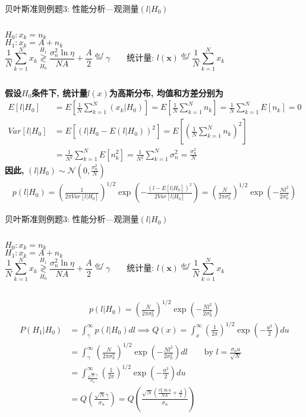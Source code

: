 \begin{frame}[shrink]{贝叶斯准则例题3: 性能分析---观测量$(l|H_0)$}
\begin{columns}
	$H_0:x_k=n_k$\\
	$H_1:x_k=A+n_k$
	\[
	\frac{1}{N}\sum\limits_{k=1}^{N}x_k\mathop{\gtrless}\limits_{H_0}^{H_1}\frac{\sigma_n^2\ln\eta}{NA}+\frac{A}{2}\mathop{=}\limits^{def}\gamma \qquad \textbf{统计量: }l(\bm{x})\mathop{=}\limits^{def}\frac{1}{N}\sum\limits_{k=1}^{N}x_k
	\]
\end{columns}
\textbf{假设$H_0$条件下, 统计量$l(x)$为高斯分布, 均值和方差分别为}
\begin{align*}
E[l|H_0]&=E\left[\frac{1}{N}\sum\limits_{k=1}^{N}(x_k|H_0)\right]=E\left[\frac{1}{N}\sum\limits_{k=1}^{N}n_k\right]=\frac{1}{N}\sum\limits_{k=1}^{N}E[n_k]=0\\
Var[l|H_0]&=E\left[(l|H_0-E(l|H_0))^2\right]=E\left[\left(\frac{1}{N}\sum\limits_{k=1}^{N}n_k\right)^2\right]\\
&=\frac{1}{N^2}\sum\limits_{k=1}^{N}E[n_k^2]=\frac{1}{N^2}\sum\limits_{k=1}^{N}\sigma_n^2=\frac{\sigma_n^2}{N}
\end{align*}
\textbf{因此, }$(l|H_0)\sim\mathcal{N}(0,\frac{\sigma_n^2}{N})$
\begin{align*}
p(l|H_0)=\left(\frac{1}{2\pi Var[l|H_0]}\right)^{1/2}\exp\left(-\frac{(l-E[l|H_0])^2}{2 Var[l|H_0]}\right)=\left(\frac{N}{2\pi\sigma_n^2}\right)^{1/2}\exp\left(-\frac{Nl^2}{2\sigma_n^2}\right)
\end{align*}
\end{frame}

\begin{frame}[shrink]{贝叶斯准则例题3: 性能分析---观测量$(l|H_0)$}
\begin{columns}
	$H_0:x_k=n_k$\\
	$H_1:x_k=A+n_k$
	\[
	\frac{1}{N}\sum\limits_{k=1}^{N}x_k\mathop{\gtrless}\limits_{H_0}^{H_1}\frac{\sigma_n^2\ln\eta}{NA}+\frac{A}{2}\mathop{=}\limits^{def}\gamma \qquad \textbf{统计量: }l(\bm{x})\mathop{=}\limits^{def}\frac{1}{N}\sum\limits_{k=1}^{N}x_k
	\]
\end{columns}
\begin{align*}
p(l|H_0)=\left(\frac{N}{2\pi\sigma_n^2}\right)^{1/2}\exp\left(-\frac{Nl^2}{2\sigma_n^2}\right)
\end{align*}
\begin{align*}
P(H_1|H_0)&=\int_{\gamma}^{\infty}p(l|H_0)dl\implies Q(x)=\int_{x}^{\infty}\left(\frac{1}{2\pi}\right)^{1/2}\exp\left(-\frac{u^2}{2}\right)du\\
&=\int_{\gamma}^{\infty}\left(\frac{N}{2\pi\sigma_n^2}\right)^{1/2}\exp\left(-\frac{Nl^2}{2\sigma_n^2}\right)dl\qquad \text{by } l=\frac{\sigma_nu}{\sqrt{N}}\\
&=\int_{\frac{\sqrt{N}\gamma}{\sigma_n}}^{\infty}\left(\frac{1}{2\pi}\right)^{1/2}\exp\left(-\frac{u^2}{2}\right)du\\
&=Q\left(\frac{\sqrt{N}\gamma}{\sigma_n}\right)=Q\left(\frac{\sqrt{N}\left(\frac{\sigma_n^2\ln\eta}{NA}+\frac{A}{2}\right)}{\sigma_n}\right)
\end{align*}
\end{frame}

